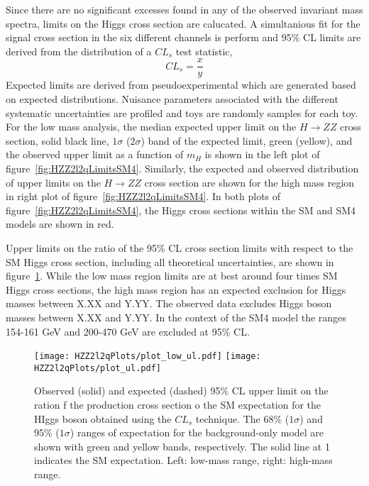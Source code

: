 Since there are no significant excesses found in any of the observed 
invariant mass spectra, limits on the Higgs cross section are calucated.
A simultanious fit for the signal cross section in the six different
channels is perform and 95\% CL limits are derived from the distribution 
of a $CL_s$ test statistic,
\begin{equation}
CL_s = \frac{x}{y}
\end{equation}
Expected limits are derived from pseudoexperimental which are generated
based on expected distributions.  Nuisance parameters associated with
the different systematic uncertainties are profiled and toys are randomly
samples for each toy.  For the low mass analysis, the median expected upper 
limit on the $H\to ZZ$ cross section, solid black line, $1\sigma$ ($2\sigma$) 
band of the expected limit,  
green (yellow), and the observed upper limit as a function of $m_H$ is 
shown in the left plot of figure~\ref{fig:HZZ2l2qLimitsSM4}.  Similarly, 
the expected and 
observed distribution of upper limits on the $H\to ZZ$ cross section are 
shown for the high mass region in right plot of 
figure~\ref{fig:HZZ2l2qLimitsSM4}.  In both plots of 
figure~\ref{fig:HZZ2l2qLimitsSM4}, the Higgs cross sections within the 
SM and SM4\cite{???} models are shown in red.  

Upper limits on the ratio of the 95\% CL cross section limits with respect
to the SM Higgs cross section, including all theoretical uncertainties, 
are shown in figure~\ref{fig:HZZ2l2qLimits}.  While the low mass region
limits are at best around four times SM Higgs cross sections, the high mass
region has an expected exclusion for Higgs masses between X.XX and Y.YY. 
The observed data excludes Higgs boson masses between X.XX and Y.YY.
In the context of the SM4 model the ranges 154-161 GeV and 200-470 GeV 
are excluded at 95\% CL. 

\begin{figure}
\begin{center}
\texttt{[image: HZZ2l2qPlots/plot\_low\_ul.pdf]}
\texttt{[image: HZZ2l2qPlots/plot\_ul.pdf]}
\label{fig:HZZ2l2qLimits}
\caption{Observed (solid) and expected (dashed) 95\% CL upper limit on
the ration f the production cross section o the SM expectation for the 
HIggs boson obtained using the $CL_s$ technique.  The 68\% ($1\sigma$) 
and 95\% ($1\sigma$) ranges of expectation for the background-only model
are shown with green and yellow bands, respectively.  The solid line at 
1 indicates the SM expectation.  Left: low-mass range, right: high-mass
range. }
\end{center}
\end{figure}

